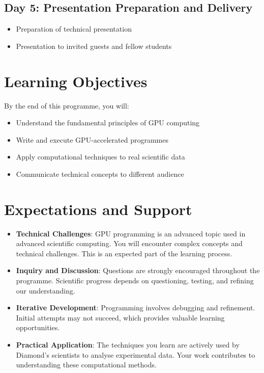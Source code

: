 \documentclass[11pt, a4paper]{article}
\begin{document}
\subsection*{Day 5: Presentation Preparation and Delivery}
\begin{itemize}
    \item Preparation of technical presentation
    \item Presentation to invited guests and fellow students
\end{itemize}

\section*{Learning Objectives}

By the end of this programme, you will:
\begin{itemize}
    \item Understand the fundamental principles of GPU computing
    \item Write and execute GPU-accelerated programmes
    \item Apply computational techniques to real scientific data
    \item Communicate technical concepts to different audience
\end{itemize}

\section*{Expectations and Support}

\begin{itemize}
    \item \textbf{Technical Challenges}: GPU programming is an advanced topic
used in advanced scientific computing. You will encounter complex concepts and
technical challenges. This is an expected part of the learning process.
    \item \textbf{Inquiry and Discussion}: Questions are strongly encouraged
throughout the programme. Scientific progress depends on questioning, testing,
and refining our understanding.
    \item \textbf{Iterative Development}: Programming involves debugging and
refinement. Initial attempts may not succeed, which provides valuable
learning opportunities.
    \item \textbf{Practical Application}: The techniques you learn are actively
used by Diamond's scientists to analyse experimental data. Your work
contributes to understanding these computational methods.
\end{itemize}
\end{document}
